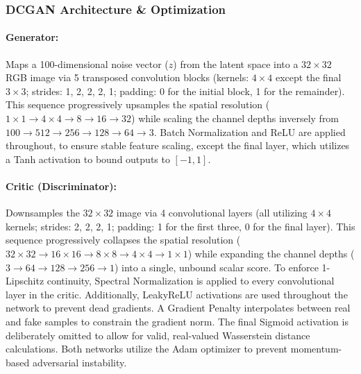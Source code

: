 \documentclass[runningheads]{llncs}
\begin{document}
\subsubsection{DCGAN Architecture \& Optimization}
\paragraph{\normalfont\textbf{Generator:}}
Maps a 100-dimensional noise vector ($z$) from the latent space into a $32 \times 32$ RGB image via 5 transposed convolution blocks (kernels: $4 \times 4$ except the final $3 \times 3$; strides: 1, 2, 2, 2, 1; padding: 0 for the initial block, 1 for the remainder). This sequence progressively upsamples the spatial resolution ($1 \times 1 \rightarrow 4 \times 4 \rightarrow 8 \rightarrow 16 \rightarrow 32$) while scaling the channel depths inversely from $100 \rightarrow 512 \rightarrow 256 \rightarrow 128 \rightarrow 64 \rightarrow 3$. Batch Normalization and ReLU are applied throughout, to ensure stable feature scaling, except the final layer, which utilizes a Tanh activation to bound outputs to $[-1, 1]$.




\paragraph{\normalfont\textbf{Critic (Discriminator):}}

Downsamples the $32 \times 32$ image via 4 convolutional layers (all utilizing $4 \times 4$ kernels; strides: 2, 2, 2, 1; padding: 1 for the first three, 0 for the final layer). This sequence progressively collapses the spatial resolution ($32 \times 32 \rightarrow 16 \times 16 \rightarrow 8 \times 8 \rightarrow 4 \times 4 \rightarrow 1 \times 1$) while expanding the channel depths ($3 \rightarrow 64 \rightarrow 128 \rightarrow 256 \rightarrow 1$) into a single, unbound scalar score. To enforce 1-Lipschitz continuity, Spectral Normalization is applied to every convolutional layer in the critic. Additionally, LeakyReLU activations are used throughout the network to prevent dead gradients. A  Gradient Penalty interpolates between real and fake samples to constrain the gradient norm. The final Sigmoid activation is deliberately omitted to allow for valid, real-valued Wasserstein distance calculations. Both networks utilize the Adam optimizer to prevent momentum-based adversarial instability.
\end{document}

